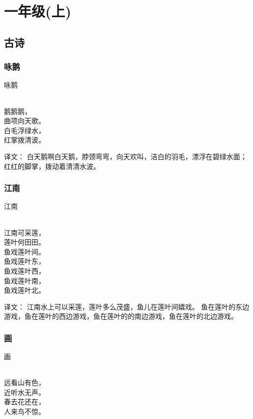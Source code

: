 \chapter{一年级(上)}
\section{古诗}
\subsection{咏鹅}

\begin{pinyinscope}
\noindent \huge 咏鹅

 \\

\noindent 鹅鹅鹅，\\
曲项向天歌。\\
白毛浮绿水，\\
红掌拨清波。
\end{pinyinscope}

译文：
白天鹅啊白天鹅，脖颈弯弯，向天欢叫，洁白的羽毛，漂浮在碧绿水面；红红的脚掌，拨动着清清水波。

\subsection{江南}

\begin{pinyinscope}
\noindent \huge 江南

 \\

\noindent 江南可采莲，\\
莲叶何田田。\\
鱼戏莲叶间。\\
鱼戏莲叶东，\\
鱼戏莲叶西，\\
鱼戏莲叶南，\\
鱼戏莲叶北。
\end{pinyinscope}

译文：
江南水上可以采莲，莲叶多么茂盛，鱼儿在莲叶间嬉戏。
鱼在莲叶的东边游戏，鱼在莲叶的西边游戏，鱼在莲叶的的南边游戏，鱼在莲叶的北边游戏。


\subsection{画}
\begin{pinyinscope}
	\noindent \huge 画
	
	 \\
	
	\noindent 远看山有色，\\
	近听水无声。\\
	春去花还在，\\
	人来鸟不惊。
\end{pinyinscope}

